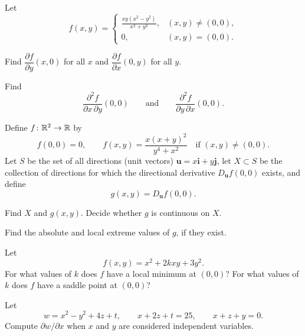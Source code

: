 \begin{problem}
Let
\[
f(x,y)=
\begin{cases}
\displaystyle\frac{xy(x^2-y^2)}{x^2+y^2}, & (x,y)\ne(0,0),\\[0.6em]
0, & (x,y)=(0,0).
\end{cases}
\]
\begin{problemsubparts}
\item Find $\dfrac{\partial f}{\partial y}(x,0)$ for all $x$ and $\dfrac{\partial f}{\partial x}(0,y)$ for all $y$.
\item Find
\[
\frac{\partial^2 f}{\partial x\,\partial y}(0,0)
\qquad\text{and}\qquad
\frac{\partial^2 f}{\partial y\,\partial x}(0,0).
\]
\end{problemsubparts}
\end{problem}

\begin{problem}
Define $f\colon\mathbb{R}^2\to\mathbb{R}$ by
\[
f(0,0)=0,
\qquad
f(x,y)=\frac{x(x+y)^2}{y^4+x^2}
\quad\text{if }(x,y)\ne(0,0).
\]
Let $S$ be the set of all directions (unit vectors) $\mathbf u=x\mathbf i+y\mathbf j$, let $X\subset S$ be the collection of directions for which the directional derivative $D_{\mathbf u}f(0,0)$ exists, and define
\[
g(x,y)=D_{\mathbf u}f(0,0).
\]
\begin{problemsubparts}
\item Find $X$ and $g(x,y)$. Decide whether $g$ is continuous on $X$.
\item Find the absolute and local extreme values of $g$, if they exist.
\end{problemsubparts}
\end{problem}

\begin{problem}
\begin{problemsubparts}
\item Let
\[
f(x,y)=x^2+2kxy+3y^2.
\]
For what values of $k$ does $f$ have a local minimum at $(0,0)$? For what values of $k$ does $f$ have a saddle point at $(0,0)$?
\item Let
\[
w=x^2-y^2+4z+t,
\qquad
x+2z+t=25,
\qquad
x+z+y=0.
\]
Compute $\partial w/\partial x$ when $x$ and $y$ are considered independent variables.
\end{problemsubparts}
\end{problem}

